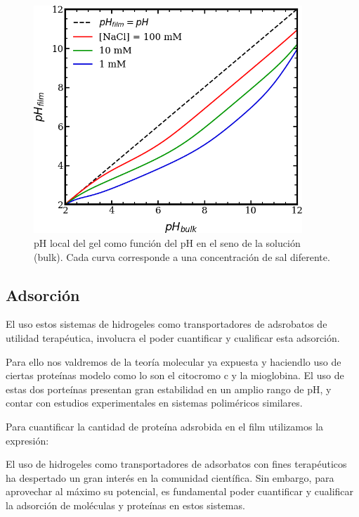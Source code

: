 \begin{figure}
    \centering
    \includegraphics[width=0.9\textwidth]{Figures/graph-film/pH-local.png}
    \caption{pH local del gel como funci\'on del pH en el seno de la soluci\'on (bulk). Cada curva corresponde a una concentraci\'on de sal diferente.}
    \label{fig:film:pH-local}
\end{figure}

\subsection{Adsorci\'on}\label{sec:film:resu-absorcion}

El uso estos sistemas de hidrogeles como transportadores de adsrobatos de utilidad terap\'eutica, involucra el poder cuantificar y cualificar esta adsorci\'on.
 
Para ello nos valdremos de la teor\'ia molecular ya expuesta y haciendlo uso de ciertas prote\'inas modelo como lo son el citocromo c y la mioglobina. El uso de estas dos porte\'inas presentan gran estabilidad en un amplio rango de pH, y contar con estudios experimentales en sistemas polim\'ericos similares.

Para cuantificar la cantidad de prote\'ina adsrobida en el film utilizamos la expresi\'on:


El uso de hidrogeles como transportadores de adsorbatos con fines terap\'euticos ha despertado un gran inter\'es en la comunidad cient\'ifica. Sin embargo, para aprovechar al m\'aximo su potencial, es fundamental poder cuantificar y cualificar la adsorci\'on de mol\'eculas y prote\'inas en estos sistemas.

